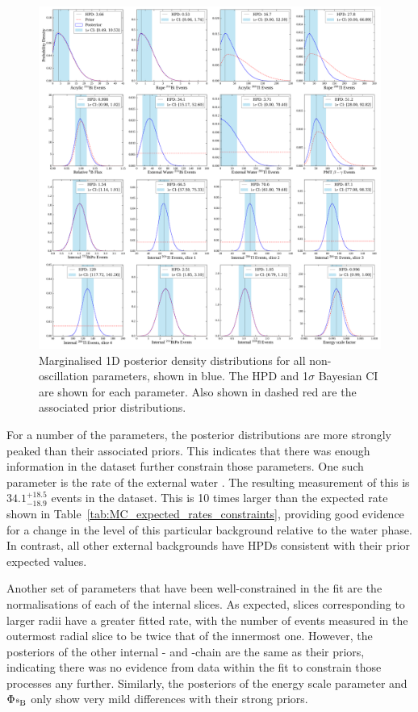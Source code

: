 \begin{figure}
    \centering
    \includegraphics[width=\textwidth]{6_SolarAnalysis/images/posterior_densities_plot_no_osc.pdf}
    \caption[Marginalised 1D posterior density distributions for all non-oscillation parameters.]
    {Marginalised 1D posterior density distributions for all non-oscillation parameters, shown in blue. The HPD and 1$\sigma$ Bayesian CI are shown for each parameter. Also shown in dashed red are the associated prior distributions.}
    \label{fig:nuisance_params_marged}
\end{figure}

For a number of the parameters, the posterior distributions are more strongly peaked than their associated priors. This indicates that there was enough information in the dataset further constrain those parameters. One such parameter is the rate of the external water . The resulting measurement of this is $34.1^{+18.5}_{-18.9}$ events in the dataset. This is 10 times larger than the expected rate shown in Table~\ref{tab:MC_expected_rates_constraints}, providing good evidence for a change in the level of this particular background relative to the water phase. In contrast, all other external backgrounds have HPDs consistent with their prior expected values.

Another set of parameters that have been well-constrained in the fit are the normalisations of each of the internal  slices. As expected, slices corresponding to larger radii have a greater fitted rate, with the number of events measured in the outermost radial slice to be twice that of the innermost one. However, the posteriors of the other internal - and -chain are the same as their priors, indicating there was no evidence from data within the fit to constrain those processes any further. Similarly, the posteriors of the energy scale parameter and $\Phi_{\beight{}}$ only show very mild differences with their strong priors.

